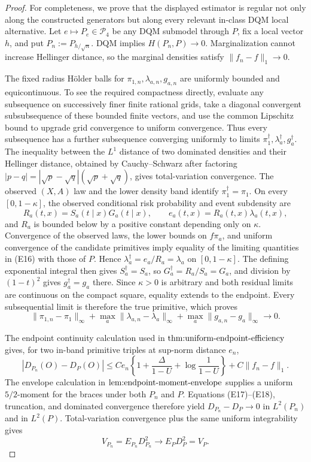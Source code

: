 \documentclass{article}
\begin{document}
\begin{proof}
For completeness, we prove that the displayed estimator is regular not only along the constructed generators but along every relevant in-class DQM local alternative.  Let \(e\mapsto P_e\in\mathcal P_4\) be any DQM submodel through \(P\), fix a local vector \(h\), and put \(P_n:=P_{h/\sqrt n}\).  DQM implies \(H(P_n,P)\to0\).  Marginalization cannot increase Hellinger distance, so the marginal densities satisfy \(\lVert f_n-f\rVert_1\to0\).

The fixed radius H\"older balls for \(\pi_{1,n},\lambda_{a,n},g_{a,n}\) are uniformly bounded and equicontinuous.  To see the required compactness directly, evaluate any subsequence on successively finer finite rational grids, take a diagonal convergent subsubsequence of these bounded finite vectors, and use the common Lipschitz bound to upgrade grid convergence to uniform convergence.  Thus every subsequence has a further subsequence converging uniformly to limits \(\pi_1^{\dagger},\lambda_a^{\dagger},g_a^{\dagger}\).  The inequality between the \(L^1\) distance of two dominated densities and their Hellinger distance, obtained by Cauchy--Schwarz after factoring \(|p-q|=|\sqrt p-\sqrt q|(\sqrt p+\sqrt q)\), gives total-variation convergence.  The observed \((X,A)\) law and the lower density band identify \(\pi_1^{\dagger}=\pi_1\).  On every \([0,1-\kappa]\), the observed conditional risk probability and event subdensity are
\[
 R_a(t,x)=S_a(t\mid x)G_a(t\mid x),\qquad
 e_a(t,x)=R_a(t,x)\lambda_a(t,x),                                   \tag{E16}
\]
and \(R_a\) is bounded below by a positive constant depending only on \(\kappa\).  Convergence of the observed laws, the lower bounds on \(f\pi_a\), and uniform convergence of the candidate primitives imply equality of the limiting quantities in (E16) with those of \(P\).  Hence \(\lambda_a^{\dagger}=e_a/R_a=\lambda_a\) on \([0,1-\kappa]\).  The defining exponential integral then gives \(S_a^{\dagger}=S_a\), so \(G_a^{\dagger}=R_a/S_a=G_a\), and division by \((1-t)^2\) gives \(g_a^{\dagger}=g_a\) there.  Since \(\kappa>0\) is arbitrary and both residual limits are continuous on the compact square, equality extends to the endpoint.  Every subsequential limit is therefore the true primitive, which proves
\[
 \lVert\pi_{1,n}-\pi_1\rVert_\infty
 +\max_a\lVert\lambda_{a,n}-\lambda_a\rVert_\infty
 +\max_a\lVert g_{a,n}-g_a\rVert_\infty\longrightarrow0.             \tag{E17}
\]

The endpoint continuity calculation used in \(\textnormal{thm:uniform-endpoint-efficiency}\) gives, for two in-band primitive triples at sup-norm distance \(e_n\),
\[
 |D_{P_n}(O)-D_P(O)|
 \le C e_n\left\{1+\frac{\Delta}{1-U}+\log\frac1{1-U}\right\}
       +C\lVert f_n-f\rVert_1.                                        \tag{E18}
\]
The envelope calculation in \(\textnormal{lem:endpoint-moment-envelope}\) supplies a uniform \(5/2\)-moment for the braces under both \(P_n\) and \(P\).  Equations (E17)--(E18), truncation, and dominated convergence therefore yield \(D_{P_n}-D_P\to0\) in \(L^2(P_n)\) and in \(L^2(P)\).  Total-variation convergence plus the same uniform integrability gives
\[
 V_{P_n}=E_{P_n}D_{P_n}^2\longrightarrow E_PD_P^2=V_P.                \tag{E19}
\]


\end{proof}
\end{document}
